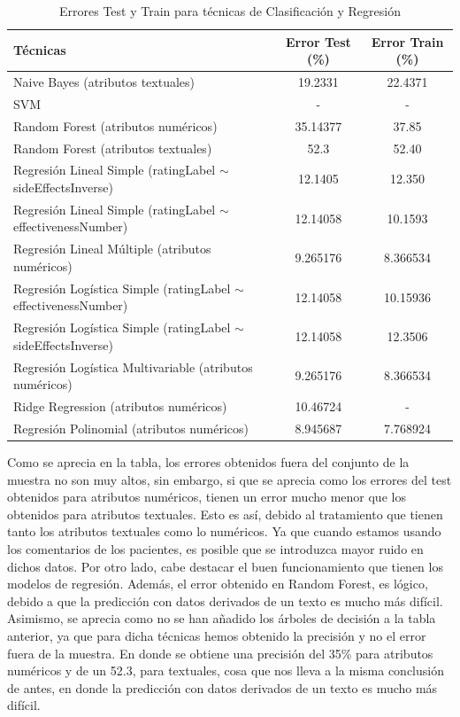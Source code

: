 \documentclass[spanish,]{article}
\begin{document}
\begin{table}[h]
\centering
  \begin{tabular}{|l|c|c|}
    \hline
    \textbf{Técnicas} & \textbf{Error Test (\%)} & \textbf{Error Train (\%)} \\ \hline
    Naive Bayes (atributos textuales) & 19.2331 & 22.4371 \\ \hline
    SVM & - & - \\ \hline
    Random Forest (atributos numéricos) & 35.14377 & 37.85 \\ \hline
    Random Forest (atributos textuales) & 52.3 & 52.40\\ \hline
    Regresión Lineal Simple (ratingLabel $\sim$ sideEffectsInverse) & 12.1405 & 12.350 \\ \hline
    Regresión Lineal Simple (ratingLabel $\sim$ effectivenessNumber) & 12.14058 & 10.1593 \\ \hline
    Regresión Lineal Múltiple (atributos numéricos) & 9.265176 & 8.366534 \\ \hline
    Regresión Logística Simple (ratingLabel $\sim$ effectivenessNumber) & 12.14058 & 10.15936 \\ \hline
    Regresión Logística Simple (ratingLabel $\sim$ sideEffectsInverse) & 12.14058 & 12.3506 \\ \hline
    Regresión Logística Multivariable (atributos numéricos) & 9.265176 & 8.366534 \\ \hline
    Ridge Regression (atributos numéricos) & 10.46724 & - \\ \hline
    Regresión Polinomial (atributos numéricos) & 8.945687 & 7.768924 \\ \hline
  \end{tabular}
  \caption{Errores Test y Train para técnicas de Clasificación y Regresión}
\end{table}

Como se aprecia en la tabla, los errores obtenidos fuera del conjunto de
la muestra no son muy altos, sin embargo, si que se aprecia como los
errores del test obtenidos para atributos numéricos, tienen un error
mucho menor que los obtenidos para atributos textuales. Esto es así,
debido al tratamiento que tienen tanto los atributos textuales como lo
numéricos. Ya que cuando estamos usando los comentarios de los
pacientes, es posible que se introduzca mayor ruido en dichos datos. Por
otro lado, cabe destacar el buen funcionamiento que tienen los modelos
de regresión. Además, el error obtenido en Random Forest, es lógico,
debido a que la predicción con datos derivados de un texto es mucho más
difícil. Asimismo, se aprecia como no se han añadido los árboles de
decisión a la tabla anterior, ya que para dicha técnicas hemos obtenido
la precisión y no el error fuera de la muestra. En donde se obtiene una
precisión del 35\% para atributos numéricos y de un 52.3, para
textuales, cosa que nos lleva a la misma conclusión de antes, en donde
la predicción con datos derivados de un texto es mucho más difícil.
\end{document}
